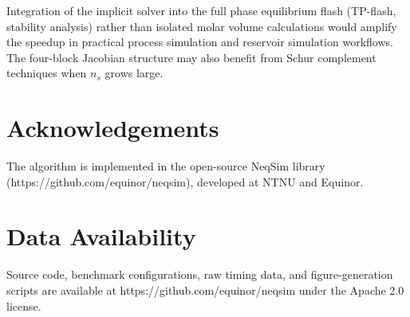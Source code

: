 \documentclass[review,3p]{elsarticle}
\begin{document}
Integration of the implicit solver into the full phase equilibrium flash (TP-flash, stability analysis) rather than isolated molar volume calculations would amplify the speedup in practical process simulation and reservoir simulation workflows. The four-block Jacobian structure may also benefit from Schur complement techniques when $n_s$ grows large.


\section{Acknowledgements}

The algorithm is implemented in the open-source NeqSim library (https://github.com/equinor/neqsim), developed at NTNU and Equinor.

\section{Data Availability}

Source code, benchmark configurations, raw timing data, and figure-generation scripts are available at https://github.com/equinor/neqsim under the Apache 2.0 license.




\end{document}
